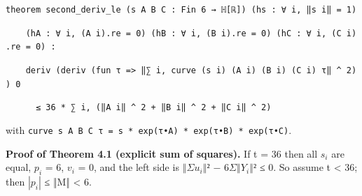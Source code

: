 \documentclass[11pt,a4paper]{article}
\theoremstyle{named}
\begin{document}
\begin{leancode}
\item \texttt{theorem\ \allowbreak{}second\_\allowbreak{}deriv\_\allowbreak{}le\ \allowbreak{}(s\ \allowbreak{}A\ \allowbreak{}B\ \allowbreak{}C\ \allowbreak{}:\ \allowbreak{}Fin\ \allowbreak{}6\ \allowbreak{}→\ \allowbreak{}ℍ[ℝ])\ \allowbreak{}(hs\ \allowbreak{}:\ \allowbreak{}∀\ \allowbreak{}i,\ \allowbreak{}‖s\ \allowbreak{}i‖\ \allowbreak{}=\ \allowbreak{}1)}
\item \texttt{\ \allowbreak{}\ \allowbreak{}\ \allowbreak{}\ \allowbreak{}(hA\ \allowbreak{}:\ \allowbreak{}∀\ \allowbreak{}i,\ \allowbreak{}(A\ \allowbreak{}i).\allowbreak{}re\ \allowbreak{}=\ \allowbreak{}0)\ \allowbreak{}(hB\ \allowbreak{}:\ \allowbreak{}∀\ \allowbreak{}i,\ \allowbreak{}(B\ \allowbreak{}i).\allowbreak{}re\ \allowbreak{}=\ \allowbreak{}0)\ \allowbreak{}(hC\ \allowbreak{}:\ \allowbreak{}∀\ \allowbreak{}i,\ \allowbreak{}(C\ \allowbreak{}i).\allowbreak{}re\ \allowbreak{}=\ \allowbreak{}0)\ \allowbreak{}:}
\item \texttt{\ \allowbreak{}\ \allowbreak{}\ \allowbreak{}\ \allowbreak{}deriv\ \allowbreak{}(deriv\ \allowbreak{}(fun\ \allowbreak{}τ\ \allowbreak{}=\textgreater{}\ \allowbreak{}‖∑\ \allowbreak{}i,\ \allowbreak{}curve\ \allowbreak{}(s\ \allowbreak{}i)\ \allowbreak{}(A\ \allowbreak{}i)\ \allowbreak{}(B\ \allowbreak{}i)\ \allowbreak{}(C\ \allowbreak{}i)\ \allowbreak{}τ‖\ \allowbreak{}\textasciicircum{}\ \allowbreak{}2))\ \allowbreak{}0}
\item \texttt{\ \allowbreak{}\ \allowbreak{}\ \allowbreak{}\ \allowbreak{}\ \allowbreak{}\ \allowbreak{}≤\ \allowbreak{}36\ \allowbreak{}*\ \allowbreak{}∑\ \allowbreak{}i,\ \allowbreak{}(‖A\ \allowbreak{}i‖\ \allowbreak{}\textasciicircum{}\ \allowbreak{}2\ \allowbreak{}+\ \allowbreak{}‖B\ \allowbreak{}i‖\ \allowbreak{}\textasciicircum{}\ \allowbreak{}2\ \allowbreak{}+\ \allowbreak{}‖C\ \allowbreak{}i‖\ \allowbreak{}\textasciicircum{}\ \allowbreak{}2)}
\end{leancode}
with \texttt{curve\ \allowbreak{}s\ \allowbreak{}A\ \allowbreak{}B\ \allowbreak{}C\ \allowbreak{}τ\ \allowbreak{}=\ \allowbreak{}s\ \allowbreak{}*\ \allowbreak{}exp(τ•A)\ \allowbreak{}*\ \allowbreak{}exp(τ•B)\ \allowbreak{}*\ \allowbreak{}exp(τ•C)}.

\textbf{Proof of Theorem 4.1 (explicit sum of squares).} If t = 36 then all $s_i$ are equal, $p_i$ = 6, $v_i$ = 0, and the left side is $‖Σu_i‖²$ − $6Σ‖Y_i‖²$ ≤ 0. So assume t \textless{} 36; then $|p_i|$ ≤ ‖M‖ \textless{} 6.
\end{document}
